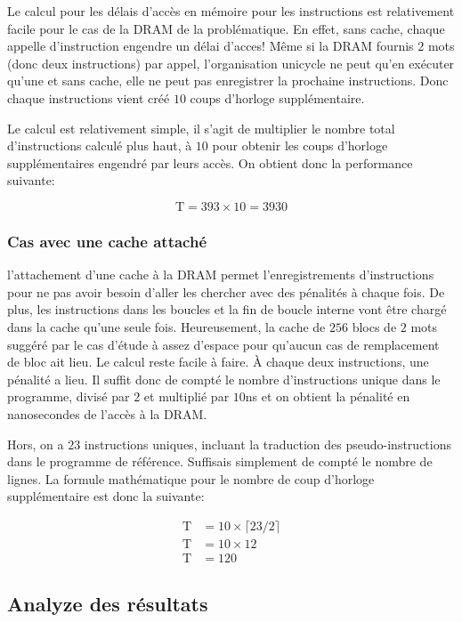 \documentclass[a11paper]{article}
\begin{document}
Le calcul pour les délais d'accès en mémoire pour les instructions est
relativement facile pour le cas de la DRAM de la problématique. En effet,
sans cache, chaque appelle d'instruction engendre un délai d'acces! Même si
la DRAM fournis $2$ mots (donc deux instructions) par appel, l'organisation
unicycle ne peut qu'en exécuter qu'une et sans cache, elle ne peut pas
enregistrer la prochaine instructions. Donc chaque instructions vient créé $10$
coups d'horloge supplémentaire.

Le calcul est relativement simple, il s'agit de multiplier le nombre total
d'instructions calculé plus haut, à $10$ pour obtenir les coups d'horloge
supplémentaires engendré par leurs accès. On obtient donc la performance
suivante:

\begin{equation}
  \text{T}=393\times10=3930
\end{equation}

\subsubsection{Cas avec une cache attaché}

l'attachement d'une cache à la DRAM permet l'enregistrements d'instructions
pour ne pas avoir besoin d'aller les chercher avec des pénalités à chaque
fois. De plus, les instructions dans les boucles et la fin de boucle interne
vont être chargé dans la cache qu'une seule fois. Heureusement, la cache de
$256$ blocs de $2$ mots suggéré par le cas d'étude à assez d'espace pour
qu'aucun cas de remplacement de bloc ait lieu. Le calcul reste facile à
faire. À chaque deux instructions, une pénalité a lieu. Il suffit donc de
compté le nombre d'instructions unique dans le programme, divisé par $2$ et
multiplié par $10$ns et on obtient la pénalité en nanosecondes de l'accès à
la DRAM.

Hors, on a $23$ instructions uniques, incluant la traduction des
pseudo-instructions dans le programme de référence. Suffisais simplement de
compté le nombre de lignes. La formule mathématique pour le nombre de coup
d'horloge supplémentaire est donc la suivante:

\begin{align}
  \text{T} &= 10\times\lceil23/2\rceil \\
  \text{T} &= 10\times12 \\
  \text{T} &= 120
\end{align}

\subsection{Analyze des résultats}
\end{document}
